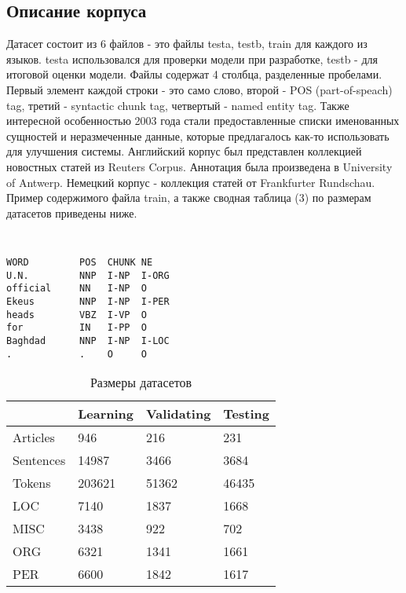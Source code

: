 \subsection{Описание корпуса}

Датасет состоит из 6 файлов - это файлы testa, testb, train для каждого из языков. testa использовался для проверки модели при разработке, testb - для итоговой оценки модели. Файлы содержат 4 столбца, разделенные пробелами. Первый элемент каждой строки - это само слово, второй - POS (part-of-speach) tag, третий - syntactic chunk tag, четвертый - named entity tag. Также интересной особенностью 2003 года стали предоставленные списки именованных сущностей и неразмеченные данные, которые предлагалось как-то использовать для улучшения системы. Английский корпус был представлен коллекцией новостных статей из Reuters Corpus. Аннотация была произведена в University of Antwerp. Немецкий корпус - коллекция статей от Frankfurter Rundschau. Пример содержимого файла train, а также сводная таблица (3) по размерам датасетов приведены ниже.

{\tt \small
\begin{verbatim}
WORD         POS  CHUNK NE
U.N.         NNP  I-NP  I-ORG 
official     NN   I-NP  O 
Ekeus        NNP  I-NP  I-PER 
heads        VBZ  I-VP  O 
for          IN   I-PP  O 
Baghdad      NNP  I-NP  I-LOC 
.            .    O     O 
\end{verbatim}
}


\begin{table}[ht]
\centering
\caption{Размеры датасетов}
\label{size}
\begin{tabular}{|l|l|l|l|}
\hline
\textbf{} & \textbf{Learning} & \textbf{Validating} & \textbf{Testing} \\ \hline
Articles  & 946               & 216                 & 231              \\ \hline
Sentences & 14987             & 3466                & 3684             \\ \hline
Tokens    & 203621            & 51362               & 46435            \\ \hline
LOC       & 7140              & 1837                & 1668             \\ \hline
MISC      & 3438              & 922                 & 702              \\ \hline
ORG       & 6321              & 1341                & 1661             \\ \hline
PER       & 6600              & 1842                & 1617             \\ \hline
\end{tabular}
\end{table}

